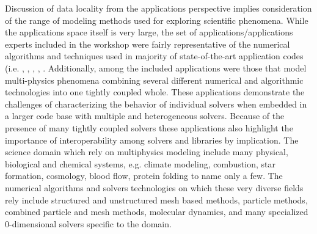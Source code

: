 %
%
$ $\\
\noindent
Discussion of data locality from the applications perspective implies
consideration of the range of modeling methods used for exploring
scientific phenomena. While the  
applications space itself is very large, the set of
applications/applications experts included in the workshop were fairly 
representative of the numerical algorithms and techniques used in
majority of state-of-the-art application codes (i.e. \cite{cosmo},
\cite{gromacs}, \cite{Hydra, op2}, \cite{chombo}, \cite{vis}.
Additionally, among the included applications were those that model
multi-physics phenomena combining several different numerical and
algorithmic technologies into one tightly coupled whole. These
applications demonstrate the challenges of characterizing the behavior
of individual solvers when embedded in a larger code base with
multiple and heterogeneous solvers.  Because of the presence of many
tightly coupled solvers these applications also
highlight the importance of interoperability among solvers and
libraries by implication. The science domain which rely on multiphysics modeling
include many physical, biological and chemical systems, e.g. climate
modeling, combustion, star formation, cosmology, blood flow, protein
folding to name only a few. The numerical algorithms and solvers
technologies on which these very diverse fields rely include
structured and unstructured mesh based methods, particle methods,
combined particle and mesh methods, molecular dynamics,  and many
specialized 0-dimensional solvers specific to the domain. 

